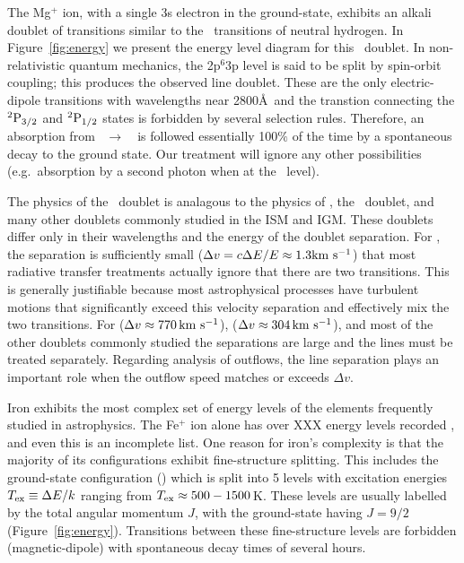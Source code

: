 \documentclass[12pt,preprint]{aastex}
\begin{document}
The Mg$^+$ ion, with a single 3s electron in the ground-state,
exhibits an alkali doublet of transitions similar to the
\lya\ transitions of neutral hydrogen.  In Figure~\ref{fig:energy}
we present the energy level diagram for this 
\mgiid\ doublet.  In non-relativistic quantum
mechanics, the 2p$^6$3p level is said to be split by spin-orbit
coupling; this produces the observed line doublet.  These are the only
 electric-dipole transitions 
with wavelengths near 2800\AA\ and the transtion connecting
the $\rm {}^2P_{3/2}$ and $\rm {}^2P_{1/2}$ states is forbidden by several
selection rules.  Therefore, an absorption from
\maconfig~$\to$~\mbconfig\
is followed essentially 100$\%$ of the time by a spontaneous decay to the
ground state. Our treatment will ignore any other possibilities
(e.g.\ absorption by a second photon when at the \mbconfig\ level).

The physics of the \mgiid\ doublet
is analagous to the physics of 
\lya, the \naid\ doublet, and many other doublets commonly
studied in the ISM and IGM.  These doublets differ only in
their wavelengths and the energy of the doublet separation. 
For  \lya, the
separation is sufficiently small ($\Delta v = c \Delta E / E \approx
1.3 {\rm km~s^{-1}}$) that most radiative transfer treatments actually ignore that
there are two transitions.   This is generally justifiable
because 
most astrophysical processes have turbulent motions that
significantly exceed this velocity separation and effectively mix the
two transitions.  For \ion{Mg}{2} ($\Delta v \approx 770 \, {\rm km~s^{-1}}$),  
\ion{Na}{1} ($\Delta v \approx 304 \, {\rm km~s^{-1}}$), and most of the other doublets
commonly studied the separations are large and the lines
must be treated separately.  Regarding analysis of outflows, the line
separation plays an important role when the outflow speed matches or
exceeds $\Delta v$.

Iron exhibits the most complex set of energy levels of the elements
frequently studied in astrophysics.  The Fe$^+$ ion alone has over XXX
energy levels recorded \citep{iron}, and even this is an
incomplete list.  
One reason for iron's complexity is
that the majority of its configurations exhibit fine-structure splitting.
This includes the ground-state configuration (\aconfig) which is split
into 5 levels with 
excitation energies $T_{\rm ex} \equiv \Delta E / k$ ranging from
$T_{\rm ex} \approx 500-1500$\,K.  These levels are usually labelled by the total angular momentum
$J$, with the ground-state having $J=9/2$ (Figure~\ref{fig:energy}).  
Transitions between these fine-structure levels are 
forbidden (magnetic-dipole) with spontaneous decay times of several hours.  
\end{document}
